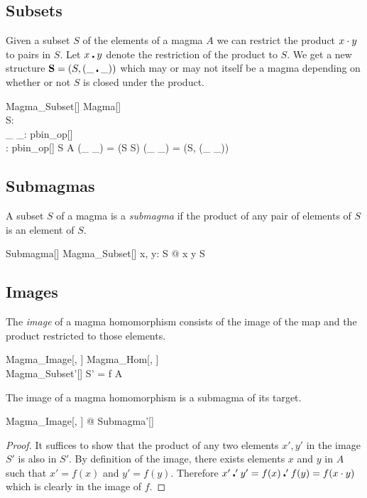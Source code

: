 \documentclass{amsart}
\begin{document}
\subsection{Subsets}

Given a subset $S$ of the elements of a magma $A$ we can
restrict the product $x \mathbin{\cdot} y$ to pairs in $S$.
Let $x \mathbin{\centerdot} y$ denote the restriction of the product to $S$.
We get a new structure $\mathbf{S} = (S, (\_ \mathbin{\centerdot} \_))$ which may or may not
itself be a magma depending on whether or not $S$ is closed under the product.

\begin{schema}{Magma\_Subset}[\genT]
	Magma[\genT] \\
	S: \power \genT \\
	\_ \opS \_: pbin\_op[\genT] \\
	\strucS: \power \genT \cross pbin\_op[\genT]
\where
	S \subseteq A
\also
	(\_ \opS \_) = (S \cross S) \dres (\_ \opG \_)
\also
	\strucS = (S, (\_ \opS \_))
\end{schema}

\subsection{Submagmas}

A subset $S$ of a magma is a \textit{submagma} if the product of any pair of elements of $S$ 
is an element of $S$.

\begin{schema}{Submagma}[\genT]
	Magma\_Subset[\genT]
\where
	\forall x, y: S @ x \opS y \in S
\end{schema}

\subsection{Images}

The \textit{image} of a magma homomorphism consists of the image of the map
and the product restricted to those elements.

\begin{schema}{Magma\_Image}[\genT, \genU]
	Magma\_Hom[\genT, \genU] \\
	Magma\_Subset'[\genU]
\where
	S' = f \limg A \rimg
\end{schema}

\begin{remark}
The image of a magma homomorphism is a submagma of its target.

\begin{zed}
	\forall Magma\_Image[\setT, \setU] @ Submagma'[\setU]
\end{zed}

\begin{proof}
It suffices to show that the product of any two elements $x', y'$ in the image $S'$ is 
also in $S'$. By definition of the image, there exists elements $x$ and $y$ in $A$
such that $x' = f(x)$ and $y' = f(y)$.
Therefore $x' \mathbin{\centerdot}' y' = f(x) \mathbin{\centerdot}' f(y) = f(x \mathbin{\cdot} y)$ which is clearly in the image of $f$. 
\end{proof}

\end{remark}
\end{document}
